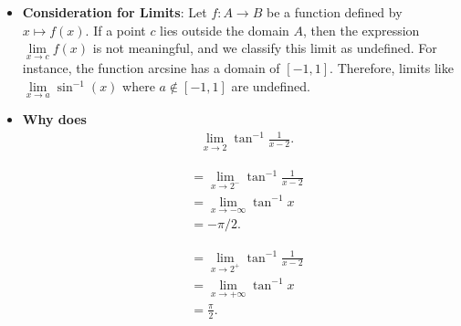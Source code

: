 \documentclass{report}
\begin{document}
\begin{itemize}
    \item \textbf{Consideration for Limits}: Let \(f: A \rightarrow B\) be a function defined by \(x \mapsto f(x)\). If a point \(c\) lies outside the domain \(A\), then the expression \(\lim\limits_{x \to c} f(x)\) is not meaningful, and we classify this limit as undefined. For instance, the function arcsine has a domain of \([-1,1]\). Therefore, limits like \(\lim\limits_{x \to a} \sin^{-1}(x)\) where \(a \notin [-1,1]\) are undefined.
    \item \textbf{Why does}
        \begin{align*}
            &\lim\limits_{x \to 2}{\tan^{-1}{\frac{1}{x-2}}} 
        .\end{align*}
        \begin{minipage}[]{0.47\textwidth}
            \begin{align*}
                &=\lim\limits_{x \to 2^{-}}{\tan^{-1}{\frac{1}{x-2}}} \\
                &= \lim\limits_{x \to -\infty}{\tan^{-1}{x}} \\
                &= -\pi/2
            .\end{align*}
        \end{minipage}
        \begin{minipage}[]{0.47\textwidth}
            \begin{align*}
                &=\lim\limits_{x \to 2^{+}}{\tan^{-1}{\frac{1}{x-2}}} \\
                &=\lim\limits_{x \to +\infty}{\tan^{-1}{x}} \\
                &=\frac{\pi}{2}
            .\end{align*}
        \end{minipage}
    \end{itemize}
\end{document}
